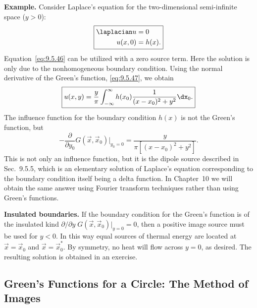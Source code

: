 \textbf{Example.}
Consider Laplace's equation for the two-dimensional semi-infinite space ($y > 0$):
\begin{equation}
\label{eq:9.5.48}
\boxed{\begin{aligned}
\laplacian u &= 0 \\
u(x,0) &= h(x).
\end{aligned}}
\end{equation}
Equation~\eqref{eq:9.5.46} can be utilized with a zero source term.  Here the solution is only due to the nonhomogeneous boundary condition.  Using the normal derivative of the Green's function, \eqref{eq:9.5.47}, we obtain
\begin{equation}
\label{eq:9.5.49}
\boxed{u(x,y) = \frac{y}{\pi}\int_{-\infty}^{\infty} h(x_0)\frac{1}{(x-x_0)^2+y^2}\dx_0.}
\end{equation}
The influence function for the boundary condition $h(x)$ is not the Green's function, but
\[
-\frac{\partial}{\partial y_0}G(\vec{x},\vec{x}_0)\bigg|_{y_0=0} = \frac{y}{\pi[(x-x_0)^2+y^2]}.
\]
This is not only an influence function, but it is the dipole source described in Sec.~9.5.5, which is an elementary solution of Laplace's equation corresponding to the boundary condition itself being a delta function.  In Chapter~10 we will obtain the same answer using Fourier transform techniques rather than using Green's functions.

\textbf{Insulated boundaries.}
If the boundary condition for the Green's function is of the insulated kind $\partial/\partial y\;G(\vec{x},\vec{x}_0)|_{y=0} = 0$, then a positive image source must be used for $y < 0$.  In this way equal sources of thermal energy are located at $\vec{x} = \vec{x}_0$ and $\vec{x} = \vec{x}_0^*$.  By symmetry, no heat will flow across $y = 0$, as desired.  The resulting solution is obtained in an exercise.

\subsection{Green's Functions for a Circle: The Method of Images}
\label{sec:greens-circle}

